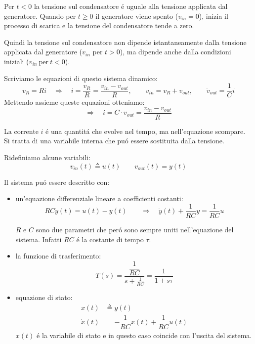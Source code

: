 \documentclass[../main.tex]{subfiles}
\begin{document}
		Per $ t<0 $ la tensione sul condensatore \'e uguale alla tensione applicata dal generatore. Quando per $ t\geq0 $ il generatore viene spento ($ v_{in}=0 $), inizia il processo di scarica e la tensione del condensatore tende a zero.
		
		Quindi la tensione sul condensatore non dipende istantaneamente dalla tensione applicata dal generatore ($ v_{in} $ per $ t>0 $), ma dipende anche dalla condizioni iniziali ($ v_{in}\ \mbox{per}\ t<0$).
		
		Scriviamo le equazioni di questo sistema dinamico:
		\[
			v_R = Ri \quad\Rightarrow\quad i = \dfrac{v_R}{R} = \dfrac{v_{in}-v_{out}}{R} , \quad  \quad
			 v_{in} = v_R + v_{out} , \quad  \quad
			\dot v_{out} = \frac{1}{C}i 
		\]
		Mettendo assieme queste equazioni otteniamo:
		\[ \Rightarrow\quad i = C \cdot v_{out} = \dfrac{v_{in}-v_{out}}{R} \]
		
		La corrente $ i $ \'e una quantit\'a che evolve nel tempo, ma nell'equazione scompare. Si tratta di una variabile interna che pu\'o essere sostituita dalla tensione.
		
		Ridefiniamo alcune variabili:
		\[ v_{in}(t) \triangleq u(t) \qquad v_{out}(t) = y(t) \]
		
		Il sistema pu\'o essere descritto con:
		\begin{itemize}
			\item
				un'equazione differenziale lineare a coefficienti costanti:
				\[
					RC \dot y(t) = u(t) - y(t) \quad \quad
					\Rightarrow\quad  \dot y(t) + \dfrac{1}{RC} y = \dfrac{1}{RC} u
				\]
				
				$ R $ e $ C $ sono due parametri che per\'o sono sempre uniti nell'equazione del sistema. Infatti $ RC $ \'e la costante di tempo $ \tau $.
			\item
				la funzione di trasferimento:
				\[ T(s) = \dfrac{\dfrac{1}{RC}}{s+\frac{1}{RC}} = \dfrac{1}{1+s\tau} \] 
			\item
				equazione di stato:
				\begin{align*}
					x(t) &\triangleq y(t)\\
					\dot x(t) &= -\dfrac{1}{RC} x(t) + \dfrac{1}{RC} u(t)
				\end{align*}
				$ x(t) $ \'e la variabile di stato e in questo caso coincide con l'uscita del sistema.
		\end{itemize}
		
		
\end{document}
